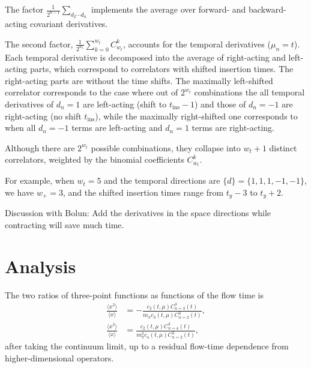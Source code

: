 \documentclass[10pt]{article}
\begin{document}
The factor $\frac{1}{2^{n-1}} \sum_{d_2 \cdots d_n}$ implements the average 
over forward- and backward-acting covariant derivatives.

The second factor, $\frac{1}{2^{w_t}} \sum_{k=0}^{w_t} C_{w_t}^k$, 
accounts for the temporal derivatives ($\mu_n = t$). 
Each temporal derivative is decomposed into the average of 
right-acting and left-acting parts, which correspond to correlators 
with shifted insertion times. The right-acting parts are without the time shifts. The maximally left-shifted correlator corresponds to the case where out of $2^{w_t}$ combinations the all temporal derivatives of $d_n = 1$ are left-acting (shift to $t_{\text{ins}}-1$) and those of $d_n = -1$ are right-acting (no shift $t_{\text{ins}}$), while the maximally right-shifted one corresponds to when all $d_n = -1$ terms are left-acting and $d_n = 1$ terms are right-acting.

Although there are $2^{w_t}$ possible combinations, they collapse 
into $w_t + 1$ distinct correlators, weighted by the binomial 
coefficients $C_{w_t}^{k}$.

For example, when $w_t = 5$ and the temporal directions are 
$\{d\} = \{1,1,1,-1,-1\}$, we have $w_+ = 3$, and the shifted insertion 
times range from $t_y - 3$ to $t_y + 2$.

Discussion with Bolun: Add the derivatives in the space directions while contracting will save much time.



\section{Analysis}
The two ratios of three-point functions as functions of the flow time is
\begin{equation}
\begin{aligned}
\frac{\langle x^2 \rangle}{\langle x \rangle} &= -\frac{c_2(t,\mu)C^3_{n=3}(t)}{m_\pi c_3(t,\mu)C^3_{n=2}(t)}, \\
\frac{\langle x^3 \rangle}{\langle x \rangle} &= \frac{c_2(t,\mu)C^3_{n=4}(t)}{m_\pi^2 c_4(t,\mu)C^3_{n=2}(t)},
\end{aligned}
\end{equation}
after taking the continuum limit, up to a residual flow-time dependence from higher-dimensional operators.



% 
\end{document}
